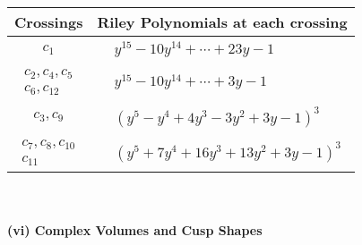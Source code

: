 \documentclass[1p]{elsarticle_modified}
\theoremstyle{definition}
\begin{document}
\begin{tabular}{m{50pt}|m{274pt}}
Crossings & \hspace{64pt}Riley Polynomials at each crossing \\
\hline $$\begin{aligned}c_{1}\end{aligned}$$&$\begin{aligned}
&y^{15}-10 y^{14}+\cdots+23 y-1
\end{aligned}$\\
\hline $$\begin{aligned}c_{2},c_{4},c_{5}\\c_{6},c_{12}\end{aligned}$$&$\begin{aligned}
&y^{15}-10 y^{14}+\cdots+3 y-1
\end{aligned}$\\
\hline $$\begin{aligned}c_{3},c_{9}\end{aligned}$$&$\begin{aligned}
&(y^5- y^4+4 y^3-3 y^2+3 y-1)^3
\end{aligned}$\\
\hline $$\begin{aligned}c_{7},c_{8},c_{10}\\c_{11}\end{aligned}$$&$\begin{aligned}
&(y^5+7 y^4+16 y^3+13 y^2+3 y-1)^3
\end{aligned}$\\
\hline
\end{tabular}\\~\\
\newpage\flushleft \textbf{(vi) Complex Volumes and Cusp Shapes}
\end{document}

